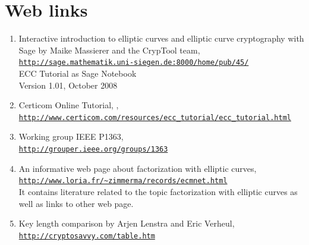 \chapter*{Web links}

\begin{enumerate}
   \item Interactive introduction to elliptic curves and elliptic curve cryptography
         with Sage by Maike Massierer and the CrypTool team,\\
         \href{http://sage.mathematik.uni-siegen.de:8000/home/pub/45/}
      {\texttt{http://sage.mathematik.uni-siegen.de:8000/home/pub/45/}} \\
          ECC Tutorial as Sage Notebook \\
         Version 1.01, October 2008
       \hypertarget{ec:Web-Link:Sage_Massierer}{} 

   \item Certicom Online Tutorial, ,\\
         \href{http://www.certicom.com/resources/ecc_tutorial/ecc_tutorial.html}
      {\texttt{http://www.certicom.com/resources/ecc\_tutorial/ecc\_tutorial.html}}
		
   \item Working group IEEE P1363, \\
         \href{http://grouper.ieee.org/groups/1363}
      {\texttt{http://grouper.ieee.org/groups/1363}}

   \item \hypertarget{Lenstra2}{}
         An informative web page about factorization with elliptic curves, \\
         \href{http://www.loria.fr/~zimmerma/records/ecmnet.html}
	 {\texttt{http://www.loria.fr/\~{}zimmerma/records/ecmnet.html}} \\
         It contains literature related to the topic factorization with 
	 elliptic curves as well as links to other web page. 

   \item Key length comparison by Arjen Lenstra and Eric Verheul,\\
         \href{http://cryptosavvy.com/table.htm}
      {\texttt{http://cryptosavvy.com/table.htm}}

\end{enumerate}



